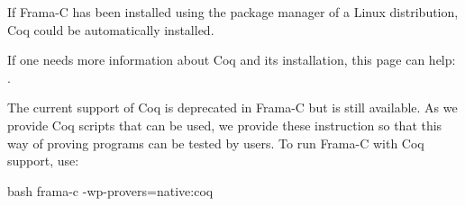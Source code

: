 \begin{Information}
  If Frama-C has been installed using the package manager of a Linux
  distribution, Coq could be automatically installed.
\end{Information}


If one needs more information about Coq and its installation, this page
can help: .



The current support of Coq is deprecated in Frama-C but is still available.
As we provide Coq scripts that can be used, we provide these instruction
so that this way of proving programs can be tested by users. To run Frama-C
with Coq support, use:



\begin{CodeBlock}{bash}
  frama-c -wp-provers=native:coq
\end{CodeBlock}
